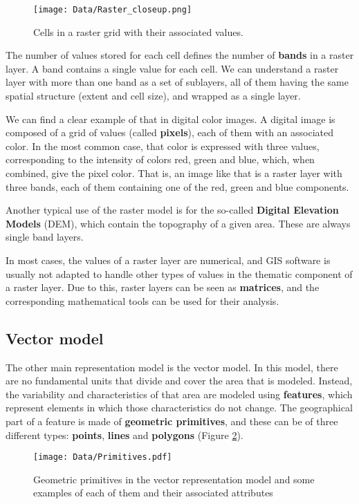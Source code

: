 \begin{figure}[!hbt]   
\centering
\texttt{[image: Data/Raster\_closeup.png]}
\caption{\small Cells in a raster grid with their associated values.}
\label{Fig:Raster_closeup} 
\end{figure}

The number of values stored for each cell defines the number of \textbf{bands} in a raster layer. A band contains a single value for each cell. We can understand a raster layer with more than one band as a set of sublayers, all of them having the same spatial structure (extent and cell size), and wrapped as a single layer.

We can find a clear example of that in digital color images. A digital image is composed of a grid of values (called \textbf{pixels}), each of them with an associated color. In the most common case, that color is expressed with three values, corresponding to the intensity of colors red, green and blue, which, when combined, give the pixel color. That is, an image like that is a raster layer with three bands, each of them containing one of the red, green and blue components.

Another typical use of the raster model is for the so-called \textbf{Digital Elevation Models} (DEM), which contain the topography of a given area. These are always single band layers.

In most cases, the values of a raster layer are numerical, and GIS software is usually not adapted to handle other types of values in the thematic component of a raster layer. Due to this, raster layers can be seen as \textbf{matrices}, and the corresponding mathematical tools can be used for their analysis.


\subsection{Vector model}


The other main representation model is the vector model. In this model, there are no fundamental units that divide and cover the area that is modeled. Instead, the variability and characteristics of that area are modeled using \textbf{features}, which represent elements in which those characteristics do not change. The geographical part of a feature is made of \textbf{geometric primitives}, and these can be of three different types: \textbf{points}, \textbf{lines} and \textbf{polygons} (Figure \ref{Fig:Primitives}).

\begin{figure}[!hbt]   
\centering
\texttt{[image: Data/Primitives.pdf]}
\caption{\small Geometric primitives in the vector representation model and some examples of each of them and their associated attributes}
\label{Fig:Primitives} 
\end{figure}

